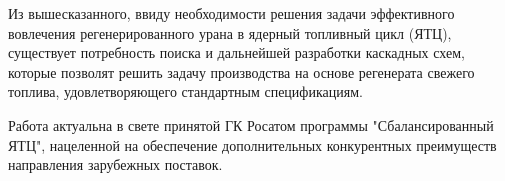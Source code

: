 Из вышесказанного, ввиду необходимости решения задачи эффективного вовлечения регенерированного урана в ядерный топливный цикл (ЯТЦ), существует потребность поиска и дальнейшей разработки каскадных схем, которые позволят решить задачу производства на основе регенерата свежего топлива, удовлетворяющего стандартным спецификациям.

Работа актуальна в свете принятой ГК Росатом программы "Сбалансированный ЯТЦ", нацеленной на обеспечение дополнительных конкурентных преимуществ направления зарубежных поставок.



